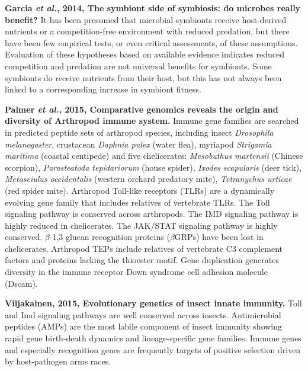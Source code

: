 \documentclass[11pt]{article}
\begin{document}
\begin{sloppypar}
\textbf{Garcia \textit{et al.}, 2014, The symbiont side of symbiosis: do microbes really benefit?} \newline
It has been presumed that microbial symbionts receive host-derived nutrients or a competition-free environment with reduced predation, but there have been few empirical tests, or even critical assessments, of these assumptions. 
Evaluation of these hypotheses based on available evidence indicates reduced competition and predation are not universal benefits for symbionts. 
Some symbionts do receive nutrients from their host, but this has not always been linked to a corresponding increase in symbiont fitness.
\par
\textbf{Palmer \textit{et al.}, 2015, Comparative genomics reveals the origin and diversity of Arthropod immune system.} \newline
Immune gene families are searched in predicted peptide sets of arthropod species, including 
insect \textit{Drosophila melanogaster}, 
crustacean \textit{Daphnia pulex} (water flea), 
myriapod \textit{Strigamia maritima} (coastal centipede) and 
five chelicerates: \textit{Mesobuthus martensii} (Chinese scorpion), 
                   \textit{Parasteatoda tepidariorum} (house spider),
                   \textit{Ixodes scapularis} (deer tick),
                   \textit{Metaseiulus occidentalis} (western orchard predatory mite),
                   \textit{Tetranychus urticae} (red spider mite). 
Arthropod Toll-like receptors (TLRs) are a dynamically evolving gene family that includes relatives of vertebrate TLRs. 
The Toll signaling pathway is conserved across arthropods. 
The IMD signaling pathway is highly reduced in chelicerates. 
The JAK/STAT signaling pathway is highly conserved. 
$\beta$-1,3 glucan recognition proteins ($\beta$GRPs) have been lost in chelicerates. 
Arthropod TEPs include relatives of vertebrate C3 complement factors and proteins lacking the thioester motif. 
Gene duplication generates diversity in the immune receptor Down syndrome cell adhesion molecule (Dscam). 
\par
\textbf{Viljakainen, 2015, Evolutionary genetics of insect innate immunity.} \newline
Toll and Imd signaling pathways are well conserved across insects. 
Antimicrobial peptides (AMPs) are the most labile component of insect immunity showing rapid gene birth-death dynamics and lineage-specific gene families. 
Immune genes and especially recognition genes are frequently targets of positive selection driven by host-pathogen arms races. 

\end{sloppypar}
\end{document}
